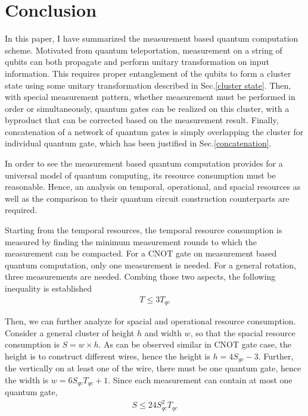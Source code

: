 \documentclass[twocolumn,secnumarabic,amssymb, nobibnotes, aps, prd]{revtex4-2}
\begin{document}
\section{Conclusion}

In this paper, I have summarized the measurement based quantum computation scheme. Motivated from quantum teleportation, measurement on a string of qubits can both propagate and perform unitary transformation on input information. This requires proper entanglement of the qubits to form a cluster state using some unitary transformation described in Sec.\ref{cluster state}. Then, with special measurement pattern, whether measurement must be performed in order or simultaneously, quantum gates can be realized on this cluster, with a byproduct that can be corrected based on the measurement result. Finally, concatenation of a network of quantum gates is simply overlapping the cluster for individual quantum gate, which has been justified in Sec.\ref{concatenation}.\par


In order to see the measurement based quantum computation provides for a universal model of quantum computing, its resource consumption must be reasonable. Hence, an analysis on temporal, operational, and spacial resources as well as the comparison to their quantum circuit construction counterparts are required. 

Starting from the temporal resources, the temporal resource consumption is measured by finding the minimum measurement rounds to which the measurement can be compacted. For a CNOT gate on measurement based quantum computation, only one measurement is needed. For a general rotation, three measurements are needed. Combing those two aspects, the following inequality is established
\begin{align*}
    T \le 3T_{qc}
\end{align*}\par

Then, we can further analyze for spacial and operational resource consumption. Consider a general cluster of height $h$ and width $w$, so that the spacial resource consumption is $S = w \times h$. As can be observed similar in CNOT gate case, the height is to construct different wires, hence the height is $h = 4 S_{gc}-3$. Further, the vertically on at least one of the wire, there must be one quantum gate, hence the width is $w = 6  S_{qc}T_{qc} + 1$. Since each measurement can contain at most one quantum gate,
\begin{align*}
    S \le 24 S_{qc}^2T_{qc}
\end{align*}
\end{document}
